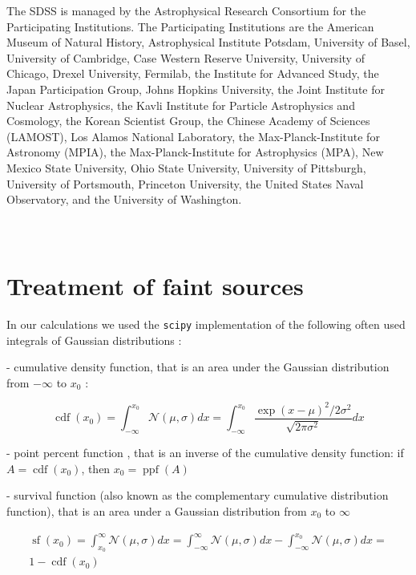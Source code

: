 \documentclass[fleqn,usenatbib]{mnras}  %
\DeclareMathOperator\cdf{cdf}
\DeclareMathOperator\sf{sf}
\DeclareMathOperator\ppf{ppf}
\begin{document}
The SDSS is managed by the Astrophysical Research Consortium for the Participating Institutions. The Participating Institutions are the American Museum of Natural History, Astrophysical Institute Potsdam, University of Basel, University of Cambridge, Case Western Reserve University, University of Chicago, Drexel University, Fermilab, the Institute for Advanced Study, the Japan Participation Group, Johns Hopkins University, the Joint Institute for Nuclear Astrophysics, the Kavli Institute for Particle Astrophysics and Cosmology, the Korean Scientist Group, the Chinese Academy of Sciences (LAMOST), Los Alamos National Laboratory, the Max-Planck-Institute for Astronomy (MPIA), the Max-Planck-Institute for Astrophysics (MPA), New Mexico State University, Ohio State University, University of Pittsburgh, University of Portsmouth, Princeton University, the United States Naval Observatory, and the University of Washington. 

\appendix
\section{\\ Treatment of faint sources}
\label{App:AppendixA}

In our calculations we used the  \verb|scipy| implementation of 
the following often used integrals of Gaussian distributions : 

- cumulative density function, that is an area under the Gaussian distribution from $-\infty$ to $x_{0}$ :

\begin{equation}
\cdf(x_{0}) = \int_{-\infty}^{x_{0}}{\mathcal{N}(\mu,\sigma)dx} = \int_{-\infty}^{x_{0}}{\frac{\exp{(x-\mu)^{2} / 2\sigma^{2}}}{\sqrt{2\pi\sigma^{2}}} dx}
\end{equation}

- point percent function , that is an inverse of the cumulative density function:  if  $A = \cdf(x_{0})$, then  $x_{0} = \ppf(A)$

- survival function (also known  as the complementary cumulative distribution function), that is an area under a Gaussian distribution from $x_{0}$ to $\infty$

\begin{multline}
\sf(x_{0}) =  \int_{x_{0}}^{\infty}{\mathcal{N}(\mu,\sigma)dx} =  \int_{-\infty}^{\infty}{\mathcal{N}(\mu,\sigma)dx} -  \int_{-\infty}^{x_{0}}{\mathcal{N}(\mu,\sigma)dx} = \\
1 - \cdf(x_{0})
\end{multline}
\end{document}
